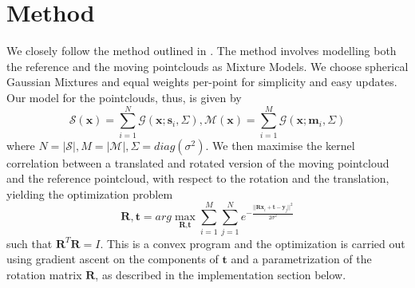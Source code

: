 \documentclass[11pt, a4paper]{article}
\begin{document}
\section{Method}
We closely follow the method outlined in \cite{main}. The method involves modelling both the reference and the moving pointclouds as Mixture Models. We choose spherical Gaussian Mixtures and equal weights per-point for simplicity and easy updates. Our model for the pointclouds, thus, is given by $$\mathcal{S}(\textbf{x}) = \sum_{i=1}^N \mathcal{G}(\textbf{x}; \textbf{s}_i, \Sigma), \mathcal{M}(\textbf{x}) = \sum_{i=1}^M \mathcal{G}(\textbf{x}; \textbf{m}_i, \Sigma)$$ where $N = |\mathcal{S}|, M = |\mathcal{M}|, \Sigma = diag(\sigma^2)$. We then maximise the kernel correlation between a translated and rotated version of the moving pointcloud and the reference pointcloud, with respect to the rotation and the translation, yielding the optimization problem $$\textbf{R}, \textbf{t} = arg\max_{\textbf{R}, \textbf{t}} \sum_{i=1}^M \sum_{j=1}^N e^{-\frac{|| \textbf{Rx}_i + \textbf{t} - \textbf{y}_j ||^2}{2 \sigma^2}}$$ such that $\textbf{R}^T \textbf{R} = I$. This is a convex program and the optimization is carried out using gradient ascent on the components of $\textbf{t}$ and a parametrization of the rotation matrix $\textbf{R}$, as described in the implementation section below.
\end{document}
